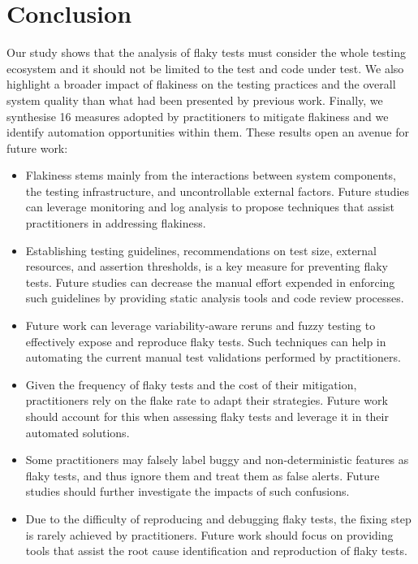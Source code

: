 \section{Conclusion}
\label{sec:survey-conclusion}

Our study shows that the analysis of flaky tests must consider the whole testing ecosystem and it should not be limited to the test and code under test.
We also highlight a broader impact of flakiness on the testing practices and the overall system quality than what had been presented by previous work. 
Finally, we synthesise 16 measures adopted by practitioners to mitigate flakiness and we identify automation opportunities within them. 
These results open an avenue for future work:

\begin{itemize}
    \item Flakiness stems mainly from the interactions between system components, the testing infrastructure, and uncontrollable external factors. 
    Future studies can leverage monitoring and log analysis to propose techniques that assist practitioners in addressing flakiness.
    
    \item Establishing testing guidelines, \eg recommendations on test size, external resources, and assertion thresholds, is a key measure for preventing flaky tests.
    Future studies can decrease the manual effort expended in enforcing such guidelines by providing static analysis tools and code review processes.
    
    \item Future work can leverage variability-aware reruns \cite{WongMLK18} and fuzzy testing to effectively expose and reproduce flaky tests.
    Such techniques can help in automating the current manual test validations performed by practitioners.
    
    \item Given the frequency of flaky tests and the cost of their mitigation, practitioners rely on the flake rate to adapt their strategies.
    Future work should account for this when assessing flaky tests and leverage it in their automated solutions.
    
    
    \item Some practitioners may falsely label buggy and non-deterministic features as flaky tests, and thus ignore them and treat them as false alerts.
    Future studies should further investigate the impacts of such confusions.
    
    \item Due to the difficulty of reproducing and debugging flaky tests, the fixing step is rarely achieved by practitioners. 
    Future work should focus on providing tools that assist the root cause identification and reproduction of flaky tests.
\end{itemize}